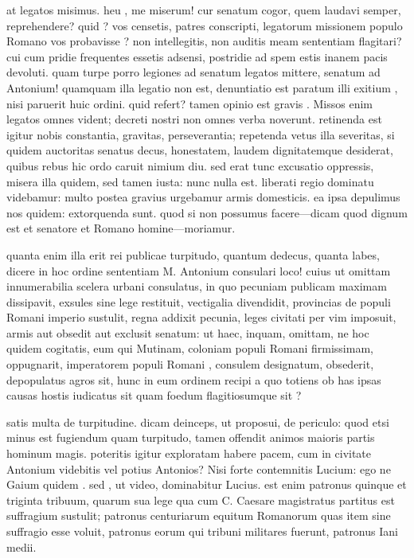  at legatos misimus. heu , me miserum! cur senatum cogor, quem laudavi semper, reprehendere? quid ? vos censetis, patres conscripti, legatorum missionem populo Romano vos probavisse ? non intellegitis, non auditis meam sententiam flagitari? cui cum pridie frequentes essetis adsensi, postridie ad spem estis inanem pacis devoluti. quam turpe porro legiones ad senatum legatos mittere, senatum ad Antonium! quamquam illa legatio non est, denuntiatio est paratum illi exitium , nisi paruerit huic ordini. quid refert? tamen opinio est gravis . Missos enim legatos omnes vident; decreti nostri non omnes verba noverunt. retinenda est igitur nobis constantia, gravitas, perseverantia; repetenda vetus illa severitas, si quidem auctoritas senatus decus, honestatem, laudem dignitatemque desiderat, quibus rebus hic ordo caruit nimium diu. sed erat tunc excusatio oppressis, misera illa quidem, sed tamen iusta: nunc nulla est. liberati regio dominatu videbamur: multo postea gravius urgebamur armis domesticis. ea ipsa depulimus nos quidem: extorquenda sunt. quod si non possumus facere—dicam quod dignum est et senatore et Romano homine—moriamur.

 quanta enim illa erit rei publicae turpitudo, quantum dedecus, quanta labes, dicere in hoc ordine sententiam M. Antonium consulari loco! cuius ut omittam innumerabilia scelera urbani consulatus, in quo pecuniam publicam maximam dissipavit, exsules sine lege restituit, vectigalia divendidit, provincias de populi Romani imperio sustulit, regna addixit pecunia, leges civitati per vim imposuit, armis aut obsedit aut exclusit senatum: ut haec, inquam, omittam, ne hoc quidem cogitatis, eum qui Mutinam, coloniam populi Romani firmissimam, oppugnarit, imperatorem populi Romani , consulem designatum, obsederit, depopulatus agros sit, hunc in eum ordinem recipi a quo totiens ob has ipsas causas hostis iudicatus sit quam foedum flagitiosumque sit ?

 satis multa de turpitudine. dicam deinceps, ut proposui, de periculo: quod etsi minus est fugiendum quam turpitudo, tamen offendit animos maioris partis hominum magis. poteritis igitur exploratam habere pacem, cum in civitate Antonium videbitis vel potius Antonios? Nisi forte contemnitis Lucium: ego ne Gaium quidem . sed , ut video, dominabitur Lucius. est enim patronus quinque et triginta tribuum, quarum sua lege qua cum C. Caesare magistratus partitus est suffragium sustulit; patronus centuriarum equitum Romanorum quas item sine suffragio esse voluit, patronus eorum qui tribuni militares fuerunt, patronus Iani medii.

